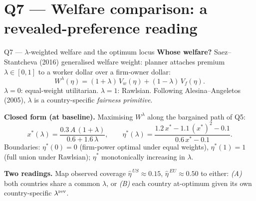 \documentclass{beamer}
\begin{document}
\section{Q7 --- Welfare comparison: a revealed-preference reading}

\begin{frame}{Q7 --- $\lambda$-weighted welfare and the optimum locus}
\textbf{Whose welfare?} Saez--Stantcheva (2016) generalised welfare weight: planner attaches premium $\lambda\!\in\![0,1]$ to a worker dollar over a firm-owner dollar:
\[
W^{\lambda}(\eta)=(1+\lambda)\,V_w(\eta)+(1-\lambda)\,V_f(\eta).
\]
$\lambda\!=\!0$: equal-weight utilitarian. $\lambda\!=\!1$: Rawlsian. Following Alesina--Angeletos (2005), $\lambda$ is a country-specific \emph{fairness primitive}.

\textbf{Closed form (at baseline).} Maximising $W^{\lambda}$ along the bargained path of Q5:
\[
x^{*}(\lambda)=\frac{0.3\,A\,(1+\lambda)}{0.6+1.6\,\lambda},\qquad
\eta^{*}(\lambda)=\frac{1.2\,x^{*}-1.1\,(x^{*})^{2}-0.1}{0.6\,x^{*}-0.1}.
\]
Boundaries: $\eta^{*}(0)\!=\!0$ (firm-power optimal under equal weights), $\eta^{*}(1)\!=\!1$ (full union under Rawlsian); $\eta^{*}$ monotonically increasing in $\lambda$.

\vspace{0.3em}
\textbf{Two readings.} Map observed coverage $\hat\eta^{\,US}\!\approx\!0.15$, $\hat\eta^{\,EU}\!\approx\!0.50$ to either: \emph{(A)} both countries share a common $\lambda$, or \emph{(B)} each country at-optimum given its own country-specific $\lambda^{\rm rev}$.
\end{frame}
\end{document}

